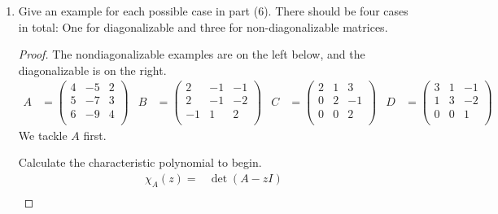 \documentclass[../psets.tex]{subfiles}
\begin{document}
\begin{enumerate}
\begin{proof}
\begin{equation*}
\begin{pmatrix}
                0 & \lambda & 0\\
                0 & 0 & \mu\\
            \end{pmatrix}
        \end{equation*}
    \end{proof}
    \item Give an example for each possible case in part (6). There should be four cases in total: One for diagonalizable and three for non-diagonalizable matrices.
    \begin{proof}
        The nondiagonalizable examples are on the left below, and the diagonalizable is on the right.
        \begin{align*}
            A &=
            \begin{pmatrix}
                4 & -5 & 2\\
                5 & -7 & 3\\
                6 & -9 & 4\\
            \end{pmatrix}&
            B &=
            \begin{pmatrix}
                2 & -1 & -1\\
                2 & -1 & -2\\
                -1 & 1 & 2\\
            \end{pmatrix}&
            C &=
            \begin{pmatrix}
                2 & 1 & 3\\
                0 & 2 & -1\\
                0 & 0 & 2\\
            \end{pmatrix}&
            D &=
            \begin{pmatrix}
                3 & 1 & -1\\
                1 & 3 & -2\\
                0 & 0 & 1\\
            \end{pmatrix}
        \end{align*}
        We tackle $A$ first.\par
        Calculate the characteristic polynomial to begin.
        \begin{align*}
            \chi_A(z) ={}& \det(A-z I)\\

\end{align*}
\end{proof}
\end{enumerate}
\end{document}
